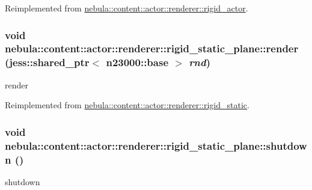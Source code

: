 Reimplemented from \hyperlink{classnebula_1_1content_1_1actor_1_1renderer_1_1rigid__actor_a595700dbe653ae7c64b01ad332065725}{nebula::content::actor::renderer::rigid\_\-actor}.\hypertarget{classnebula_1_1content_1_1actor_1_1renderer_1_1rigid__static__plane_a77394d3465965bdb4bc7aeb7a0290757}{
\subsubsection[{render}]{\setlength{\rightskip}{0pt plus 5cm}void nebula::content::actor::renderer::rigid\_\-static\_\-plane::render (jess::shared\_\-ptr$<$ {\bf n23000::base} $>$ {\em rnd})}}
\label{classnebula_1_1content_1_1actor_1_1renderer_1_1rigid__static__plane_a77394d3465965bdb4bc7aeb7a0290757}


render 

Reimplemented from \hyperlink{classnebula_1_1content_1_1actor_1_1renderer_1_1rigid__static_a37251ebb4a8c07abdff018bc8d1537fb}{nebula::content::actor::renderer::rigid\_\-static}.\hypertarget{classnebula_1_1content_1_1actor_1_1renderer_1_1rigid__static__plane_ac0d85518481b3d6fc0d15402c6878ed9}{
\subsubsection[{shutdown}]{\setlength{\rightskip}{0pt plus 5cm}void nebula::content::actor::renderer::rigid\_\-static\_\-plane::shutdown ()}}
\label{classnebula_1_1content_1_1actor_1_1renderer_1_1rigid__static__plane_ac0d85518481b3d6fc0d15402c6878ed9}


shutdown 

